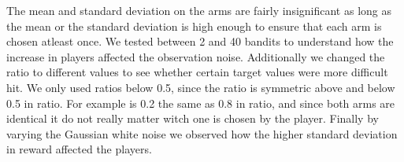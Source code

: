 The mean and standard deviation on the arms are fairly insignificant as long as the mean or the standard deviation is high enough to ensure that each arm is chosen atleast once. We tested between 2 and 40 bandits to understand how the increase in players affected the observation noise. Additionally we changed the ratio to different values to see whether certain target values were more difficult hit. We only used ratios below 0.5, since the ratio is symmetric above and below 0.5 in ratio. For example is 0.2 the same as 0.8 in ratio, and since both arms are identical it do not really matter witch one is chosen by the player. Finally by varying the Gaussian white noise we observed how the higher standard deviation in reward affected the players.




% 
% 
% 
% 
% 
% 
% 
% 
% 
% 
% 
